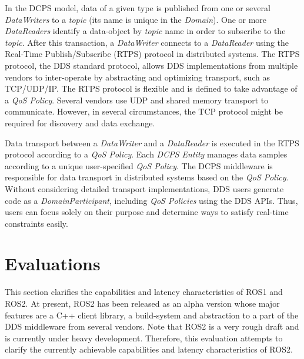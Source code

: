 \documentclass{sig-alternate-05-2015}
\begin{document}
In the DCPS model, data of a given type is published from one or several \emph{DataWriters} to a \emph{topic} (its name is unique in the \emph{Domain}).
One or more \emph{DataReaders} identify a data-object by \emph{topic} name in order to subscribe to the \emph{topic}. 
After this transaction, a \emph{DataWriter} connects to a \emph{DataReader} using the Real-Time Publish/Subscribe (RTPS) protocol \cite{rtps2.2} in distributed systems. 
The RTPS protocol, the DDS standard protocol, allows DDS implementations from multiple vendors to inter-operate by abstracting and optimizing transport, such as TCP/UDP/IP. 
The RTPS protocol is flexible and is defined to take advantage of a \emph{QoS Policy}. 
Several vendors use UDP and shared memory transport to communicate. 
However, in several circumstances, the TCP protocol might be required for discovery and data exchange.

Data transport between a \emph{DataWriter} and a \emph{DataReader} is executed in the RTPS protocol according to a \emph{QoS Policy}. 
Each \emph{DCPS Entity} manages data samples according to a unique user-specified \emph{QoS Policy}. 
The DCPS middleware is responsible for data transport in distributed systems based on the \emph{QoS Policy}. 
Without considering detailed transport implementations, DDS users generate code as a \emph{DomainParticipant}, including \emph{QoS Policies} using the DDS APIs. 
Thus, users can focus solely on their purpose and determine ways to satisfy real-time constraints easily. 

\section{Evaluations}
\label{sec:orgheadline2}

This section clarifies the capabilities and latency characteristics of ROS1 and ROS2. 
At present, ROS2 has been released as an alpha version whose major features are a C++ client library, a build-system and abstraction to a part of the DDS middleware from several vendors. 
Note that ROS2 is a very rough draft and is currently under heavy development. 
Therefore, this evaluation attempts to clarify the currently achievable capabilities and latency characteristics of ROS2.
\end{document}
